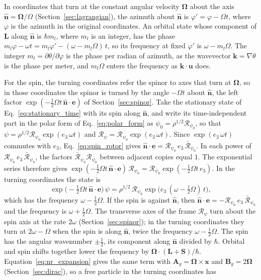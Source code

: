 \documentclass[aps,prd,onecolumn,tightenlines,nofootinbib,notitlepage,11pt,floatfix]{revtex4-2}
\theoremstyle{indentedtheorem}
\begin{document}
In coordinates that turn at the constant angular velocity $\boldsymbol{\Omega}$ about the axis $\hat{\mathbf{n}}=\boldsymbol{\Omega}/\Omega$ (Section~\ref{sec:lagrangian}), the azimuth about $\hat{\mathbf{n}}$ is $\varphi'=\varphi-\Omega t$, where $\varphi$ is the azimuth in the original coordinates. An orbital state whose component of $\mathbf{L}$ along $\hat{\mathbf{n}}$ is $\hbar m_l$, where $m_l$ is an integer, has the phase $m_l\varphi-\omega t=m_l\varphi'-(\omega-m_l\Omega)\,t$, so its frequency at fixed $\varphi'$ is $\omega-m_l\Omega$. The integer $m_l=\partial\theta/\partial\varphi$ is the phase per radian of azimuth, as the wavevector $\mathbf{k}=\nabla\theta$ is the phase per meter, and $m_l\Omega$ enters the frequency as $\mathbf{k}\cdot\mathbf{u}$ does.

For the spin, the turning coordinates refer the spinor to axes that turn at $\boldsymbol{\Omega}$, so in those coordinates the spinor is turned by the angle $-\Omega t$ about $\hat{\mathbf{n}}$, the left factor $\exp(-\tfrac{1}{2}\Omega t\,\hat{\mathbf{n}}\cdot\mathbf{e})$ of Section~\ref{sec:spinor}. Take the stationary state of Eq.~\eqref{eq:stationary_time} with its spin along $\hat{\mathbf{n}}$, and write its time-independent part in the polar form of Eq.~\eqref{eq:polar_form} as $\psi_0=\rho^{1/2}\mathcal{R}_{\psi_0}$, so that $\psi=\rho^{1/2}\mathcal{R}_{\psi_0}\exp(e_3\,\omega t)$ and $\mathcal{R}_\psi=\mathcal{R}_{\psi_0}\exp(e_3\,\omega t)$. Since $\exp(e_3\,\omega t)$ commutes with $e_3$, Eq.~\eqref{eq:spin_rotor} gives $\hat{\mathbf{n}}\cdot\mathbf{e}=\mathcal{R}_{\psi_0}\,e_3\,\bar{\mathcal{R}}_{\psi_0}$. In each power of $\mathcal{R}_{\psi_0}\,e_3\,\bar{\mathcal{R}}_{\psi_0}$, the factors $\bar{\mathcal{R}}_{\psi_0}\mathcal{R}_{\psi_0}$ between adjacent copies equal $1$. The exponential series therefore gives $\exp(-\tfrac{1}{2}\Omega t\,\hat{\mathbf{n}}\cdot\mathbf{e})\,\mathcal{R}_{\psi_0}=\mathcal{R}_{\psi_0}\exp(-\tfrac{1}{2}\Omega t\,e_3)$. In the turning coordinates the state is
\begin{equation}
    \exp\big(-\tfrac{1}{2}\Omega t\,\hat{\mathbf{n}}\cdot\mathbf{e}\big)\,\psi = \rho^{1/2}\,\mathcal{R}_{\psi_0}\exp\big(e_3\,(\omega-\tfrac{1}{2}\Omega)\,t\big) ,
    \label{eq:spin_doppler}
\end{equation}
which has the frequency $\omega-\tfrac{1}{2}\Omega$. If the spin is against $\hat{\mathbf{n}}$, then $\hat{\mathbf{n}}\cdot\mathbf{e}=-\mathcal{R}_{\psi_0}\,e_3\,\bar{\mathcal{R}}_{\psi_0}$ and the frequency is $\omega+\tfrac{1}{2}\Omega$. The transverse axes of the frame $\mathcal{R}_\psi$ turn about the spin axis at the rate $2\omega$ (Section~\ref{sec:spinor}); in the turning coordinates they turn at $2\omega-\Omega$ when the spin is along $\hat{\mathbf{n}}$, twice the frequency $\omega-\tfrac{1}{2}\Omega$. The spin has the angular wavenumber $\pm\tfrac{1}{2}$, its component along $\hat{\mathbf{n}}$ divided by $\hbar$. Orbital and spin shifts together lower the frequency by $\boldsymbol{\Omega}\cdot(\mathbf{L}+\mathbf{S})/\hbar$. Equation~\eqref{eq:nr_expansion} gives the same term with $\mathbf{A}_g=\boldsymbol{\Omega}\times\mathbf{x}$ and $\mathbf{B}_g=2\boldsymbol{\Omega}$ (Section~\ref{sec:dirac}), so a free particle in the turning coordinates has
\end{document}

